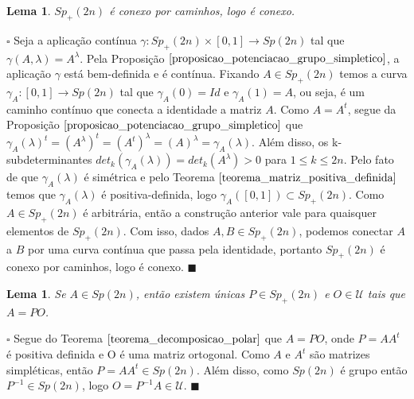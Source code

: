 \documentclass[12pt]{book}
\newtheorem{lema}[teorema]{Lema}
\newenvironment{prova}[1]{$\square$ #1}{\hfill$\blacksquare$}
\newcommand{\gruposimpletico}[1]{Sp(#1)}
\newcommand{\gruposimpleticopositivo}[1]{Sp_{+}(#1)}
\newcommand{\matrizSimpleticaOrtogonal}{\mathcal{U}}
\begin{document}
	\begin{lema}
		$\gruposimpleticopositivo{2n}$ é conexo por caminhos, logo é conexo.
	\end{lema}
	\begin{prova}
		Seja a aplicação contínua $\gamma:\gruposimpleticopositivo{2n}\times [0,1] \to \gruposimpletico{2n}$ tal que $\gamma(A,\lambda) = A^{\lambda}$. Pela Proposição $\ref{proposicao_potenciacao_grupo_simpletico}$, a aplicação $\gamma$ está bem-definida e é contínua. Fixando $A \in \gruposimpleticopositivo{2n}$ temos a curva $\gamma_{A}:[0,1]\to \gruposimpletico{2n}$ tal que $\gamma_{A}(0) = Id$ e $\gamma_{A}(1) = A$, ou seja, é um caminho contínuo que conecta a identidade a matriz $A$. Como $A=A^{t}$, segue da Proposição $\ref{proposicao_potenciacao_grupo_simpletico}$ que $\gamma_{A}(\lambda)^{t} = (A^{\lambda})^{t} = (A^{t})^{\lambda} = (A)^{\lambda} = \gamma_{A}(\lambda)$. Além disso, os k-subdeterminantes $det_{k}(\gamma_{A}(\lambda)) = det_{k}(A^{\lambda}) > 0$ para $1\leq k \leq 2n$. Pelo fato de que $\gamma_{A}(\lambda)$ é simétrica e pelo Teorema $\ref{teorema_matriz_positiva_definida}$ temos que $\gamma_{A}(\lambda)$ é positiva-definida, logo $\gamma_{A}([0,1]) \subset \gruposimpleticopositivo{2n}$. Como $A \in \gruposimpleticopositivo{2n}$ é arbitrária, então a construção anterior vale para quaisquer elementos de $\gruposimpleticopositivo{2n}$. Com isso, dados $A, B \in \gruposimpleticopositivo{2n}$, podemos conectar $A$ a $B$ por uma curva contínua que passa pela identidade, portanto $\gruposimpleticopositivo{2n}$ é conexo por caminhos, logo é conexo.
	\end{prova}	
	
	\begin{lema}\label{lema_decomposicao_grupo_simpletico_positivo}
		Se $A \in \gruposimpletico{2n}$, então existem únicas $P \in \gruposimpleticopositivo{2n}$ e $O \in \matrizSimpleticaOrtogonal$ tais que $A=PO$.
	\end{lema}
	\begin{prova}
		Segue do Teorema $\ref{teorema_decomposicao_polar}$ que $A=PO$, onde $P=AA^t$ é positiva definida e O é uma matriz ortogonal. Como $A$ e $A^{t} $ são matrizes simpléticas, então $P=AA^{t}\in \gruposimpletico{2n}$. 
		Além disso, como $\gruposimpletico{2n}$ é grupo então $P^{-1}\in \gruposimpletico{2n}$, logo $O=P^{-1}A \in \mathcal{U}$.
	\end{prova}
	
\end{document}
